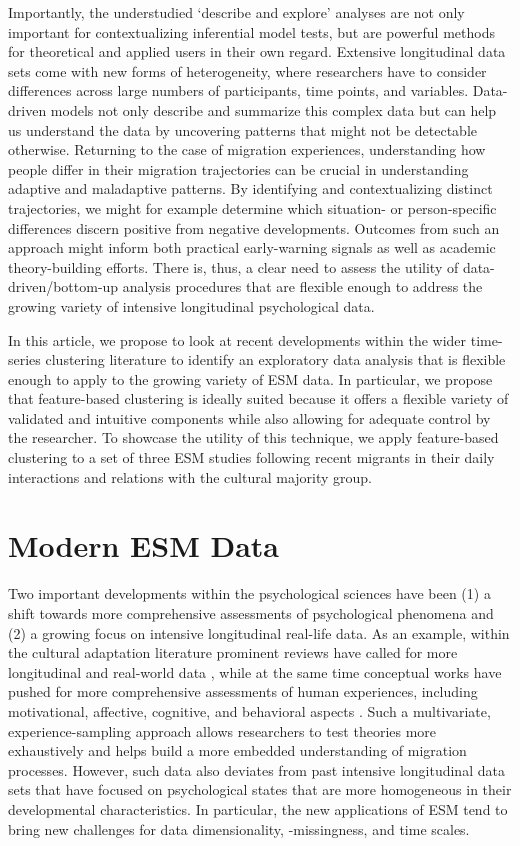 \documentclass[man, 12pt, a4paper]{apa7}
\theoremstyle{break}
\theoremstyle{plain}
\begin{document}
Importantly, the understudied `describe and explore' analyses are not only important for contextualizing inferential model tests, but are powerful methods for theoretical and applied users in their own regard. Extensive longitudinal data sets come with new forms of heterogeneity, where researchers have to consider differences across large numbers of participants, time points, and variables. Data-driven models not only describe and summarize this complex data but can help us understand the data by uncovering patterns that might not be detectable otherwise. Returning to the case of migration experiences, understanding how people differ in their migration trajectories can be crucial in understanding adaptive and maladaptive patterns. By identifying and contextualizing distinct trajectories, we might for example determine which situation- or person-specific differences discern positive from negative developments. Outcomes from such an approach might inform both practical early-warning signals as well as academic theory-building efforts. There is, thus, a clear need to assess the utility of data-driven/bottom-up analysis procedures that are flexible enough to address the growing variety of intensive longitudinal psychological data. 

In this article, we propose to look at recent developments within the wider time-series clustering literature to identify an exploratory data analysis that is flexible enough to apply to the growing variety of ESM data. In particular, we propose that feature-based clustering is ideally suited because it offers a flexible variety of validated and intuitive components while also allowing for adequate control by the researcher. To showcase the utility of this technique, we apply feature-based clustering to a set of three ESM studies following recent migrants in their daily interactions and relations with the cultural majority group. 

\section{Modern ESM Data}
Two important developments within the psychological sciences have been (1) a shift towards more comprehensive assessments of psychological phenomena and (2) a growing focus on intensive longitudinal real-life data. As an example, within the cultural adaptation literature prominent reviews have called for more longitudinal \citep[e.g.,][]{Ward2019} and real-world data \citep[e.g.,][]{McKeown2017}, while at the same time conceptual works have pushed for more comprehensive assessments of human experiences, including motivational, affective, cognitive, and behavioral aspects \citep[e.g.,][]{Kreienkamp2022d}. Such a multivariate, experience-sampling approach allows researchers to test theories more exhaustively and helps build a more embedded understanding of migration processes. However, such data also deviates from past intensive longitudinal data sets that have focused on psychological states that are more homogeneous in their developmental characteristics. In particular, the new applications of ESM tend to bring new challenges for data dimensionality, -missingness, and time scales. 
\end{document}
